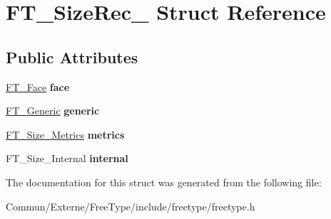\hypertarget{struct_f_t___size_rec__}{}\section{F\+T\+\_\+\+Size\+Rec\+\_\+ Struct Reference}
\label{struct_f_t___size_rec__}
\subsection*{Public Attributes}
\begin{DoxyCompactItemize}
\item 
\hyperlink{struct_f_t___face_rec__}{F\+T\+\_\+\+Face} {\bfseries face}\hypertarget{struct_f_t___size_rec___a21b54fb07feaba8be23321054da98f5f}{}\label{struct_f_t___size_rec___a21b54fb07feaba8be23321054da98f5f}

\item 
\hyperlink{struct_f_t___generic__}{F\+T\+\_\+\+Generic} {\bfseries generic}\hypertarget{struct_f_t___size_rec___aa24520b093a9b4ba9ff388bfe7b9491d}{}\label{struct_f_t___size_rec___aa24520b093a9b4ba9ff388bfe7b9491d}

\item 
\hyperlink{struct_f_t___size___metrics__}{F\+T\+\_\+\+Size\+\_\+\+Metrics} {\bfseries metrics}\hypertarget{struct_f_t___size_rec___a29a6b518d09f6cf1714d9aed01eddc01}{}\label{struct_f_t___size_rec___a29a6b518d09f6cf1714d9aed01eddc01}

\item 
F\+T\+\_\+\+Size\+\_\+\+Internal {\bfseries internal}\hypertarget{struct_f_t___size_rec___a236c47ea3138e485c29b0d7baa5cf3b6}{}\label{struct_f_t___size_rec___a236c47ea3138e485c29b0d7baa5cf3b6}

\end{DoxyCompactItemize}


The documentation for this struct was generated from the following file\+:\begin{DoxyCompactItemize}
\item 
Commun/\+Externe/\+Free\+Type/include/freetype/freetype.\+h\end{DoxyCompactItemize}

